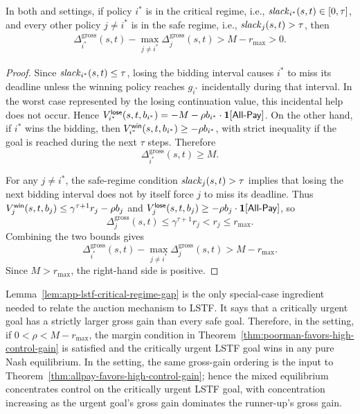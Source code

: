 \begin{lemma}\label{lem:app-lstf-critical-regime-gap}
  In both \poorman and \allpay settings, if policy \(i^*\) is in the critical regime, i.e., \(\mathit{slack}_{i^*}(s,t)\in[0,\tau]\), and every other policy \(j\neq i^*\) is in the safe regime, i.e., \(\mathit{slack}_j(s,t)>\tau\), then
  \begin{align}\label{eq:app-lstf-gross-gain-urgency}
    \Delta_{i^*}^{\mathrm{gross}}(s,t)
    -
    \max_{j\neq i^*}\Delta_j^{\mathrm{gross}}(s,t)
    > M-r_{\max}>0.
  \end{align}
\end{lemma}

\begin{proof}
  Since \(\mathit{slack}_{i^*}(s,t)\leq \tau\), losing the bidding interval causes \(i^*\) to miss its deadline unless the winning policy reaches \(g_{i^*}\) incidentally during that interval.
  In the worst case represented by the losing continuation value, this incidental help does not occur.
  Hence \(V_{i^*}^{\mathsf{lose}}(s,t,b_{i^*})=-M-\rho b_{i^*}\cdot\mathbf{1}[\text{\textsf{All-Pay}}]\).
  On the other hand, if \(i^*\) wins the bidding, then \(V_{i^*}^{\mathsf{win}}(s,t,b_{i^*})\geq -\rho b_{i^*}\), with strict inequality if the goal is reached during the next \(\tau\) steps.
  Therefore
  \[
    \Delta_{i^*}^{\mathrm{gross}}(s,t)\geq M.
  \]

  For any \(j\neq i^*\), the safe-regime condition \(\mathit{slack}_j(s,t)>\tau\) implies that losing the next bidding interval does not by itself force \(j\) to miss its deadline.
  Thus \(V_j^{\mathsf{win}}(s,t,b_j)\leq \gamma^{\tau+1}r_j-\rho b_j\) and \(V_j^{\mathsf{lose}}(s,t,b_j)\geq-\rho b_j\cdot\mathbf{1}[\text{\textsf{All-Pay}}]\), so
  \[
    \Delta_j^{\mathrm{gross}}(s,t)
    \leq
    \gamma^{\tau+1}r_j
    < r_j
    \leq r_{\max}.
  \]
  Combining the two bounds gives
  \[
    \Delta_{i^*}^{\mathrm{gross}}(s,t)-\max_{j\neq i^*}\Delta_j^{\mathrm{gross}}(s,t)
    > M-r_{\max}.
  \]
  Since \(M>r_{\max}\), the right-hand side is positive.
\end{proof}

Lemma~\ref{lem:app-lstf-critical-regime-gap} is the only special-case ingredient needed to relate the auction mechanism to LSTF.
It says that a critically urgent goal has a strictly larger gross gain than every safe goal.
Therefore, in the \poorman setting, if \(0<\rho<M-r_{\max}\), the margin condition in Theorem~\ref{thm:poorman-favors-high-control-gain} is satisfied and the critically urgent LSTF goal wins in any pure Nash equilibrium.
In the \allpay setting, the same gross-gain ordering is the input to Theorem~\ref{thm:allpay-favors-high-control-gain}; hence the mixed equilibrium concentrates control on the critically urgent LSTF goal, with concentration increasing as the urgent goal's gross gain dominates the runner-up's gross gain.


